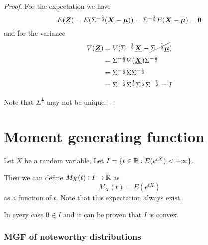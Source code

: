 \documentclass[14pt]{extarticle}
\renewcommand{\vec}[1]{\uvec{#1}}
\begin{document}
\begin{proof}
    For the expectation we have
    \begin{equation}
        E(\vec Z) = E(\Sigma^{-\frac{1}{2}} (\vec X -\vec \mu)) = \Sigma^{-\frac{1}{2}} E(\vec X -\vec \mu) = \vec 0
    \end{equation}
    and for the variance
    \begin{align}
        V(\vec Z) & = V(\Sigma^{-\frac{1}{2}} \vec X - \cancel{\Sigma^{-\frac{1}{2}} \vec \mu})                 \\
                  & = \Sigma^{-\frac{1}{2}} V(\vec X) \Sigma^{-\frac{1}{2}}                                     \\
                  & = \Sigma^{-\frac{1}{2}} \Sigma \Sigma^{-\frac{1}{2}}                                        \\
                  & = \Sigma^{-\frac{1}{2}} \Sigma^{\frac{1}{2}} \Sigma^{\frac{1}{2}} \Sigma^{-\frac{1}{2}} = I
    \end{align}

    Note that $\Sigma^{\frac{1}{2}}$ may not be unique.
\end{proof}

\section{Moment generating function}

\begin{definition}
    Let $X$ be a random variable.
    Let $I = \{t \in \mathbb{R} : E(e^{tX}) < + \infty \}$.

    Then we can define $M_X(t): I \to \mathbb{R}$ as
    \begin{equation}
        M_X(t) = E(e^{tX})
    \end{equation}
    as a function of $t$.
    Note that this expectation always exist.

    In every case $0 \in I$ and it can be proven that $I$ is convex.
\end{definition}

\subsubsection{MGF of noteworthy distributions}
\end{document}
